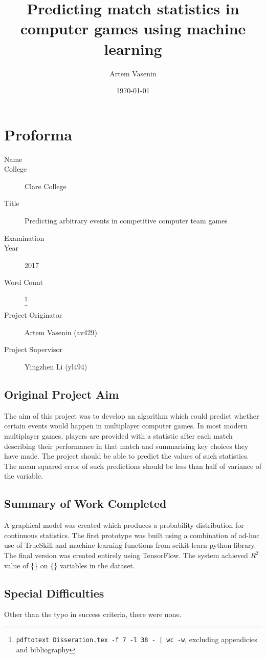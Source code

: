 \documentclass[12pt,a4paper]{book}
\title{Predicting match statistics in computer games using machine learning}
\author{Artem Vasenin}
\date{\today}
\newcommand\college{Clare College}
\begin{document}
\frontmatter
\maketitle

\section*{Proforma}
\begin{description}
\item[Name] \theauthor
\item[College] \college
\item[Title] Predicting arbitrary events in competitive computer team games
\item[Examination] %
\item[Year] 2017
\item[Word Count] \footnote{ \lstinline+pdftotext Disseration.tex -f 7 -l 38 - | wc -w+,  excluding appendicies and bibliography} %
\item[Project Originator] Artem Vasenin (av429)
\item[Project Supervisor] Yingzhen Li (yl494)
\end{description}

\subsection*{Original Project Aim}
The aim of this project was to develop an algorithm which could predict whether certain events would happen in multiplayer computer games.
In most modern multiplayer games, players are provided with a statistic after each match describing their performance in that match and summarising key choices they have made.
The project should be able to predict the values of such statistics.
The mean squared error of such predictions should be less than half of variance of the variable.
\subsection*{Summary of Work Completed}
A graphical model was created which produces a probability distribution for continuous statistics.
The first prototype was built using a combination of ad-hoc use of TrueSkill and machine learning functions from scikit-learn python library.
The final version was created entirely using TensorFlow.
The system achieved $R^2$ value of \{\}%
on \{\}%
variables in the dataset.
\subsection*{Special Difficulties}
Other than the typo in success criteria, there were none.
\end{document}
